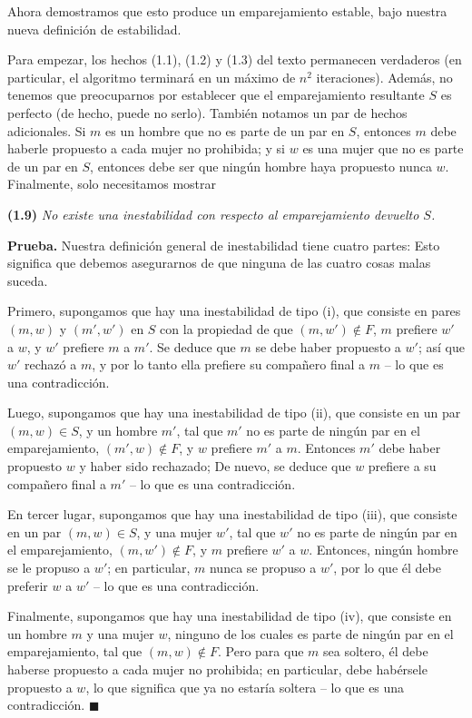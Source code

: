 \documentclass[a4paper, 12pt]{book}
\begin{document}
Ahora demostramos que esto produce un emparejamiento estable, bajo nuestra nueva definición de estabilidad.

Para empezar, los hechos (1.1), (1.2) y (1.3) del texto permanecen verdaderos (en particular, el algoritmo terminará en un máximo de $n^2$ iteraciones). Además, no tenemos que preocuparnos por establecer que el emparejamiento resultante $S$ es perfecto (de hecho, puede no serlo). También notamos un par de hechos adicionales. Si $m$ es un hombre que no es parte de un par en $S$, entonces $m$ debe haberle propuesto a cada mujer no prohibida; y si $w$ es una mujer que no es parte de un par en $S$, entonces debe ser que ningún hombre haya propuesto nunca $w$. Finalmente, solo necesitamos mostrar

\vspace{3mm}
\noindent\textbf{(1.9)} \textit{No existe una inestabilidad con respecto al emparejamiento devuelto $S$.}
\vspace{2mm}

\textbf{Prueba.} Nuestra definición general de inestabilidad tiene cuatro partes: Esto significa que debemos asegurarnos de que ninguna de las cuatro cosas malas suceda.

Primero, supongamos que hay una inestabilidad de tipo (i), que consiste en pares $(m,w)$ y $(m',w')$ en $S$ con la propiedad de que $(m,w') \notin F$, $m$ prefiere $w'$ a $w$, y $w'$ prefiere $m$ a $m'$. Se deduce que $m$ se debe haber propuesto a $w'$; así que $w'$ rechazó a $m$, y por lo tanto ella prefiere su compañero final a $m$ -- lo que es una contradicción.

Luego, supongamos que hay una inestabilidad de tipo (ii), que consiste en un par $(m,w) \in S$, y un hombre $m'$, tal que $m'$ no es parte de ningún par en el emparejamiento, $(m',w) \notin F$, y $w$ prefiere $m'$ a $m$. Entonces $m'$ debe haber propuesto $w$ y haber sido rechazado; De nuevo, se deduce que $w$ prefiere a su compañero final a $m'$ -- lo que es una contradicción. 

En tercer lugar, supongamos que hay una inestabilidad de tipo (iii), que consiste en un par $(m,w) \in S$, y una mujer $w'$, tal que $w'$ no es parte de ningún par en el emparejamiento, $(m,w') \notin F$, y $m$ prefiere $w'$ a $w$. Entonces, ningún hombre se le propuso a $w'$; en particular, $m$ nunca se propuso a $w'$, por lo que él debe preferir $w$ a $w'$ -- lo que es una contradicción.

Finalmente, supongamos que hay una inestabilidad de tipo (iv), que consiste en un hombre $m$ y una mujer $w$, ninguno de los cuales es parte de ningún par en el emparejamiento, tal que $(m,w) \notin F$. Pero para que $m$ sea soltero, él debe haberse propuesto a cada mujer no prohibida; en particular, debe habérsele propuesto a $w$, lo que significa que ya no estaría soltera -- lo que es una contradicción. $ \blacksquare $
\end{document}
